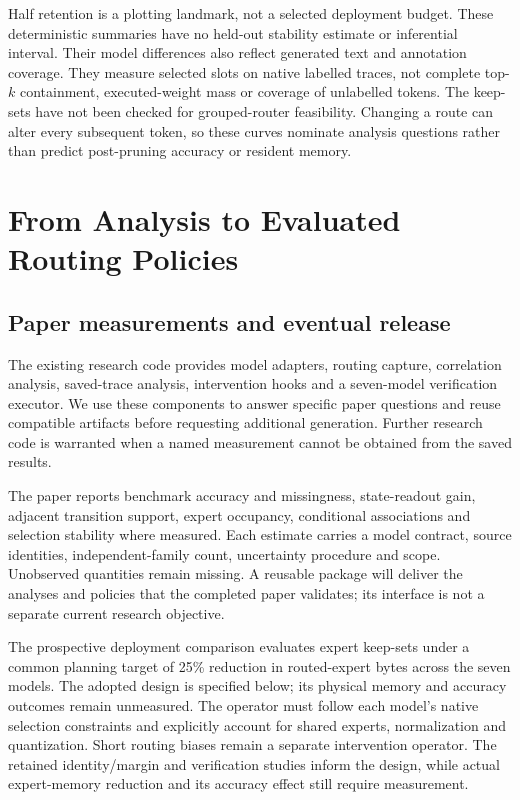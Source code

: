 Half retention is a plotting landmark, not a selected deployment budget.
These deterministic summaries have no held-out stability estimate or
inferential interval. Their model differences also reflect generated text
and annotation coverage. They measure selected slots on native labelled
traces, not complete top-$k$ containment, executed-weight mass or coverage
of unlabelled tokens. The keep-sets have not been checked for grouped-router
feasibility. Changing a route can alter every subsequent token, so these
curves nominate analysis questions rather than predict post-pruning
accuracy or resident memory.

\section{From Analysis to Evaluated Routing Policies}
\label{sec:analysis-package}

\subsection{Paper measurements and eventual release}
The existing research code provides model adapters, routing capture,
correlation analysis, saved-trace analysis, intervention hooks and a
seven-model verification executor. We use these components to answer
specific paper questions and reuse compatible artifacts before requesting
additional generation. Further research code is warranted when a named
measurement cannot be obtained from the saved results.

The paper reports benchmark accuracy and missingness, state-readout gain,
adjacent transition support, expert occupancy, conditional associations
and selection stability where measured. Each estimate carries a model
contract, source identities, independent-family count, uncertainty
procedure and scope. Unobserved quantities remain missing. A reusable
package will deliver the analyses and policies that the completed paper
validates; its interface is not a separate current research objective.

The prospective deployment comparison evaluates expert keep-sets under a
common planning target of 25\% reduction in routed-expert bytes across the seven
models. The adopted design is specified below; its physical memory and accuracy
outcomes remain unmeasured. The operator must follow each
model's native selection constraints and explicitly account for shared
experts, normalization and quantization. Short routing biases remain a
separate intervention operator. The retained identity/margin and
verification studies inform the design, while actual expert-memory
reduction and its accuracy effect still require measurement.

